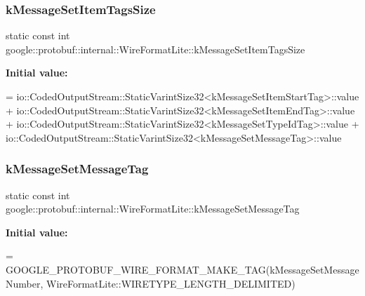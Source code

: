 \subsubsection{\texorpdfstring{k\+Message\+Set\+Item\+Tags\+Size}{kMessageSetItemTagsSize}}
{\footnotesize\ttfamily static const int google\+::protobuf\+::internal\+::\+Wire\+Format\+Lite\+::k\+Message\+Set\+Item\+Tags\+Size\hspace{0.3cm}{\ttfamily [static]}}

{\bfseries Initial value\+:}
\begin{DoxyCode}
=
  io::CodedOutputStream::StaticVarintSize32<kMessageSetItemStartTag>::value +
  io::CodedOutputStream::StaticVarintSize32<kMessageSetItemEndTag>::value +
  io::CodedOutputStream::StaticVarintSize32<kMessageSetTypeIdTag>::value +
  io::CodedOutputStream::StaticVarintSize32<kMessageSetMessageTag>::value
\end{DoxyCode}
\mbox{\label{classgoogle_1_1protobuf_1_1internal_1_1WireFormatLite_add1d6418dfbe558913f1f2d62b632d10}} 
\subsubsection{\texorpdfstring{k\+Message\+Set\+Message\+Tag}{kMessageSetMessageTag}}
{\footnotesize\ttfamily static const int google\+::protobuf\+::internal\+::\+Wire\+Format\+Lite\+::k\+Message\+Set\+Message\+Tag\hspace{0.3cm}{\ttfamily [static]}}

{\bfseries Initial value\+:}
\begin{DoxyCode}
=
    GOOGLE\_PROTOBUF\_WIRE\_FORMAT\_MAKE\_TAG(kMessageSetMessageNumber,
                                WireFormatLite::WIRETYPE\_LENGTH\_DELIMITED)
\end{DoxyCode}
\mbox{\label{classgoogle_1_1protobuf_1_1internal_1_1WireFormatLite_a19868c5a4441581de6e2a48abaf6888f}} 
